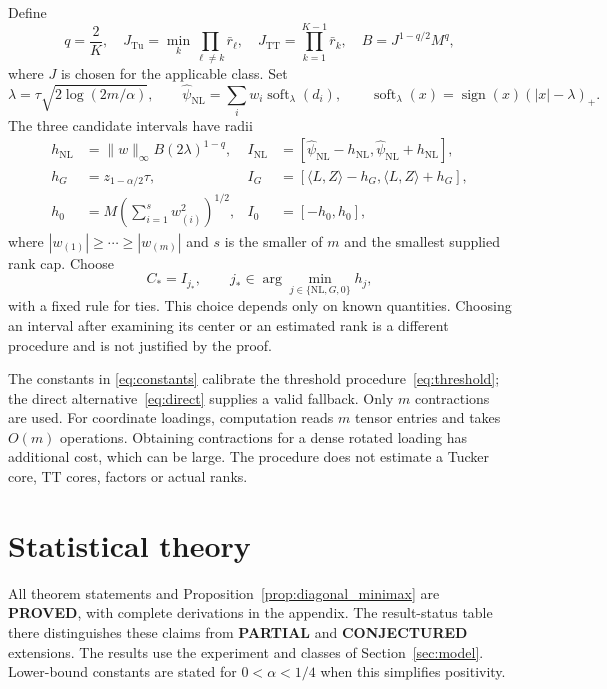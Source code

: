 \documentclass[11pt]{article}
\theoremstyle{remark}
\newcommand{\ip}[2]{\langle #1,#2\rangle}
\newcommand{\norm}[1]{\lVert #1\rVert}
\newcommand{\soft}{\operatorname{soft}}
\newcommand{\Tu}{\mathrm{Tu}}
\newcommand{\TT}{\mathrm{TT}}
\newcommand{\NL}{\mathrm{NL}}
\begin{document}
Define
\begin{equation}\label{eq:constants}
 q=\frac2K,\quad
 J_{\Tu}=\min_k\prod_{\ell\ne k}\bar r_\ell,\quad
 J_{\TT}=\prod_{k=1}^{K-1}\bar r_k,\quad B=J^{1-q/2}M^q,
\end{equation}
where $J$ is chosen for the applicable class. Set
\begin{equation}\label{eq:threshold}
 \lambda=\tau\sqrt{2\log(2m/\alpha)},\qquad
 \widehat\psi_{\NL}=\sum_iw_i\soft_\lambda(d_i),\qquad
 \soft_\lambda(x)=\operatorname{sign}(x)(|x|-\lambda)_+.
\end{equation}
The three candidate intervals have radii
\begin{align}
 h_{\NL}&=\norm w_\infty B(2\lambda)^{1-q},&
 I_{\NL}&=[\widehat\psi_{\NL}-h_{\NL},\widehat\psi_{\NL}+h_{\NL}],\label{eq:nl}\\
 h_G&=z_{1-\alpha/2}\tau,&
 I_G&=[\ip LZ-h_G,\ip LZ+h_G],\label{eq:direct}\\
 h_0&=M\left(\sum_{i=1}^s w_{(i)}^2\right)^{1/2},&
 I_0&=[-h_0,h_0],\label{eq:zero}
\end{align}
where $|w_{(1)}|\ge\cdots\ge|w_{(m)}|$ and $s$ is the smaller of $m$ and the smallest supplied rank cap. Choose
\begin{equation}\label{eq:select}
 C_*=I_{j_*},\qquad j_*\in\arg\min_{j\in\{\NL,G,0\}}h_j,
\end{equation}
with a fixed rule for ties. This choice depends only on known quantities. Choosing an interval after examining its center or an estimated rank is a different procedure and is not justified by the proof.

The constants in \eqref{eq:constants} calibrate the threshold procedure~\eqref{eq:threshold}; the direct alternative~\eqref{eq:direct} supplies a valid fallback. Only $m$ contractions are used. For coordinate loadings, computation reads $m$ tensor entries and takes $O(m)$ operations. Obtaining contractions for a dense rotated loading has additional cost, which can be large. The procedure does not estimate a Tucker core, TT cores, factors or actual ranks.

\section{Statistical theory}\label{sec:theory}

All theorem statements and Proposition~\ref{prop:diagonal_minimax} are \textbf{PROVED}, with complete derivations in the appendix. The result-status table there distinguishes these claims from \textbf{PARTIAL} and \textbf{CONJECTURED} extensions. The results use the experiment and classes of Section~\ref{sec:model}. Lower-bound constants are stated for $0<\alpha<1/4$ when this simplifies positivity.
\end{document}
